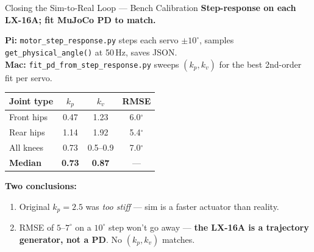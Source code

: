 \documentclass[aspectratio=169]{beamer}
\begin{document}
\begin{frame}{Closing the Sim-to-Real Loop --- Bench Calibration}
\textbf{Step-response on each LX-16A; fit MuJoCo PD to match.}

\vspace{0.3em}
\textbf{Pi:} \texttt{motor\_step\_response.py} steps each servo $\pm 10^\circ$, samples \texttt{get\_physical\_angle()} at 50\,Hz, saves JSON.\\
\textbf{Mac:} \texttt{fit\_pd\_from\_step\_response.py} sweeps $(k_p, k_v)$ for the best 2nd-order fit per servo.

\vspace{0.4em}
\small
\begin{tabular}{lccc}
    \toprule
    Joint type & $k_p$ & $k_v$ & RMSE \\
    \midrule
    Front hips         & 0.47 & 1.23 & 6.0$^\circ$ \\
    Rear hips          & 1.14 & 1.92 & 5.4$^\circ$ \\
    All knees          & 0.73 & 0.5--0.9 & 7.0$^\circ$ \\
    \midrule
    \textbf{Median}    & \textbf{0.73} & \textbf{0.87} & --- \\
    \bottomrule
\end{tabular}
\normalsize

\vspace{0.4em}
\textbf{Two conclusions:}
\begin{enumerate}\setlength{\itemsep}{0pt}
    \item Original $k_p{=}2.5$ was \emph{too stiff} --- sim is a faster actuator than reality.
    \item RMSE of $5$--$7^\circ$ on a $10^\circ$ step won't go away --- \textbf{the LX-16A is a trajectory generator, not a PD}. No $(k_p, k_v)$ matches.
\end{enumerate}
\end{frame}
\end{document}
